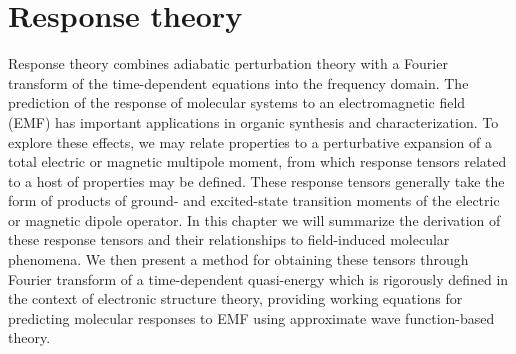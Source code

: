 \section{Response theory} \label{se:res}
Response theory combines adiabatic perturbation theory with a Fourier transform of the 
time-dependent equations into the frequency domain\cite{Barron2004,Pedersen2021}. 
The prediction of the response of molecular systems to an electromagnetic field (EMF) has 
important applications in organic synthesis and characterization. To explore these 
effects, we may relate properties to a perturbative expansion of a total electric or 
magnetic multipole moment, from which response tensors related to a host of properties 
may be defined. 
These response tensors generally take the form of products of ground- and excited-state 
transition moments of the electric or magnetic dipole operator. In this chapter we will 
summarize the derivation of these response tensors and their relationships to field-induced 
molecular phenomena. We then present a method for obtaining these tensors through Fourier 
transform of a time-dependent quasi-energy
\cite{Christiansen1998,Norman2011,Helgaker2012}
which is rigorously defined in the context of 
electronic structure theory, providing working equations for predicting molecular responses 
to EMF using approximate wave function-based theory.

